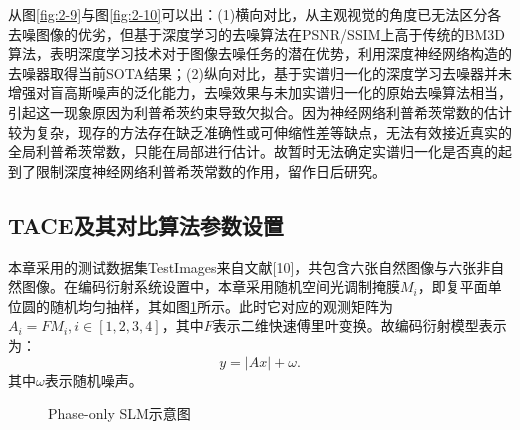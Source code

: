 从图\ref{fig:2-9}与图\ref{fig:2-10}可以出：(1)横向对比，从主观视觉的角度已无法区分各去噪图像的优劣，但基于深度学习的去噪算法在PSNR/SSIM上高于传统的BM3D算法，表明深度学习技术对于图像去噪任务的潜在优势，利用深度神经网络构造的去噪器取得当前SOTA结果；(2)纵向对比，基于实谱归一化的深度学习去噪器并未增强对盲高斯噪声的泛化能力，去噪效果与未加实谱归一化的原始去噪算法相当，引起这一现象原因为利普希茨约束导致欠拟合。因为神经网络利普希茨常数的估计较为复杂，现存的方法存在缺乏准确性或可伸缩性差等缺点，无法有效接近真实的全局利普希茨常数，只能在局部进行估计\supercite{Fazlyab}。故暂时无法确定实谱归一化是否真的起到了限制深度神经网络利普希茨常数的作用，留作日后研究。

\subsection{TACE及其对比算法参数设置}
本章采用的测试数据集TestImages来自文献[10]，共包含六张自然图像与六张非自然图像。在编码衍射系统设置中，本章采用随机空间光调制掩膜$M_i$，即复平面单位圆的随机均匀抽样，其如图\ref{fig:3-4}所示。此时它对应的观测矩阵为$A_{i}=FM_i,i\in[1,2,3,4]$，其中$F$表示二维快速傅里叶变换。故编码衍射模型表示为：
\begin{equation} \label{equation:3-22}
	y=\vert{Ax}\vert+\omega.
\end{equation}
其中$\omega$表示随机噪声。
\begin{figure}[!htbp]
	\centering
	\hspace{-0.0\linewidth}
	\hspace{-0.0\linewidth}
	\hspace{-0.0\linewidth}
	\caption{Phase-only SLM示意图}
	\label{fig:3-4}
\end{figure}

